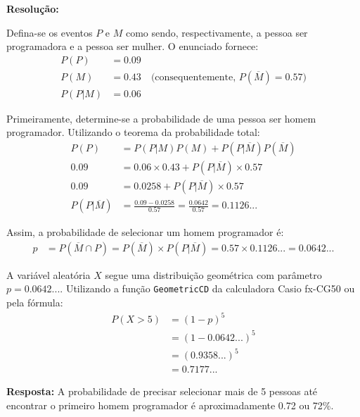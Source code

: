 \documentclass[a4paper,12pt]{article}
\begin{document}
\begin{enumerate}
  \vspace{0.3cm}

  \begin{mdframed}[backgroundcolor=gray!10, linewidth=0pt, innertopmargin=10pt, innerbottommargin=10pt]
  \textbf{Resolução:}
  
  Defina-se os eventos $P$ e $M$ como sendo, respectivamente, a pessoa ser programadora e a pessoa ser mulher. O enunciado fornece:
  \begin{align*}
    P(P) &= 0.09 \\
    P(M) &= 0.43 \quad \text{(consequentemente, } P(\overline{M}) = 0.57\text{)} \\
    P(P|M) &= 0.06
  \end{align*}

  Primeiramente, determine-se a probabilidade de uma pessoa ser homem programador. Utilizando o teorema da probabilidade total:
  \begin{align*}
    P(P) &= P(P|M)P(M) + P(P|\overline{M})P(\overline{M}) \\
    0.09 &= 0.06 \times 0.43 + P(P|\overline{M}) \times 0.57 \\
    0.09 &= 0.0258 + P(P|\overline{M}) \times 0.57 \\
    P(P|\overline{M}) &= \frac{0.09 - 0.0258}{0.57} = \frac{0.0642}{0.57} = 0.1126...
  \end{align*}

  Assim, a probabilidade de selecionar um homem programador é:
  \begin{align*}
    p &= P(\overline{M} \cap P) = P(\overline{M}) \times P(P|\overline{M}) = 0.57 \times 0.1126... = 0.0642...
  \end{align*}

  A variável aleatória $X$ segue uma distribuição geométrica com parâmetro $p = 0.0642...$. Utilizando a função \texttt{GeometricCD} da calculadora Casio fx-CG50 ou pela fórmula:
  \begin{align*}
    P(X > 5) &= (1-p)^5 \\
    &= (1-0.0642...)^5 \\
    &= (0.9358...)^5 \\
    &= 0.7177...
  \end{align*}

  \textbf{Resposta:} A probabilidade de precisar selecionar mais de 5 pessoas até encontrar o primeiro homem programador é aproximadamente 0.72 ou 72\%.
  \end{mdframed}

  \vspace{0.5cm}


\end{enumerate}
\end{document}
